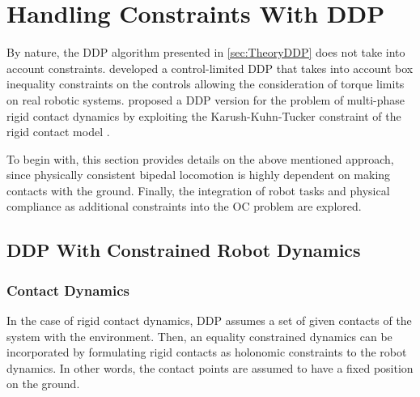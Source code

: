 %
%
%


\section{Handling Constraints With DDP}\label{sec:TheoryConstrainedDDP}
By nature, the \gls{DDP} algorithm presented in \cref{sec:TheoryDDP} does not take into account constraints. \citeauthor{tassa2014control} developed a control-limited \gls{DDP} \cite{tassa2014control} that takes into account box inequality constraints on the controls allowing the consideration of torque limits on real robotic systems. \citeauthor{budhiraja2018differential} proposed a \gls{DDP} version for the problem of multi-phase rigid contact dynamics by exploiting the Karush-Kuhn-Tucker constraint of the rigid contact model \cite{budhiraja2018differential}. 

To begin with, this section provides details on the above mentioned approach, since physically consistent bipedal locomotion is highly dependent on making contacts with the ground. Finally, the integration of robot tasks and physical compliance as additional constraints into the \gls{OC} problem are explored. 

\subsection{DDP With Constrained Robot Dynamics}\label{subsec:DDPConstrainedRobotDynamics}
\subsubsection{Contact Dynamics}
In the case of rigid contact dynamics, \gls{DDP} assumes a set of given contacts of the system with the environment. Then, an equality constrained dynamics can be incorporated by formulating rigid contacts as holonomic constraints to the robot dynamics. In other words, the contact points are assumed to have a fixed position on the ground. 

